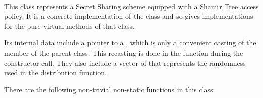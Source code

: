 \documentclass{article}
\begin{document}
\paragraph{\cShTree}

This class represents a Secret Sharing scheme equipped with a Shamir Tree access policy. It is a concrete implementation of the class \cSS and so gives implementations for the pure virtual methods of that class.

Its internal data include a pointer to a \cShTreeAP,  which is only a convenient casting of the member  of the parent class. This recasting is done in the function  during the constructor call.  They also include a vector of \cBig that represents the randomness used in the distribution function.

There are the following non-trivial non-static functions in this class:
\end{document}
